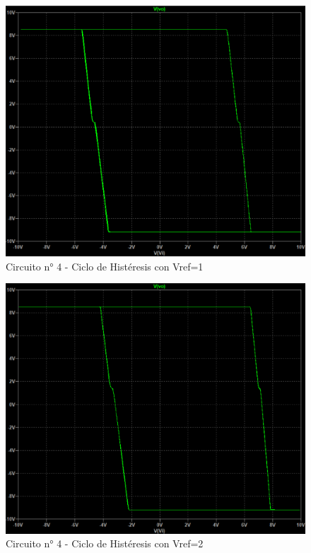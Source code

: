 \begin{figure}[h!]
    \centering
    \includegraphics[width=1.0\linewidth]{Secciones/Circuito4/Circuito 4 - Vref1.png}
    \caption{Circuito n° 4 - Ciclo de Histéresis con Vref=1}
    \label{fig:enter-label}
\end{figure}
\begin{figure}[h!]
    \centering
    \includegraphics[width=1.0\linewidth]{Secciones/Circuito4/Circuito 4 - Vref2.png}
    \caption{Circuito n° 4 - Ciclo de Histéresis con Vref=2}
    \label{fig:enter-label}
\end{figure}
